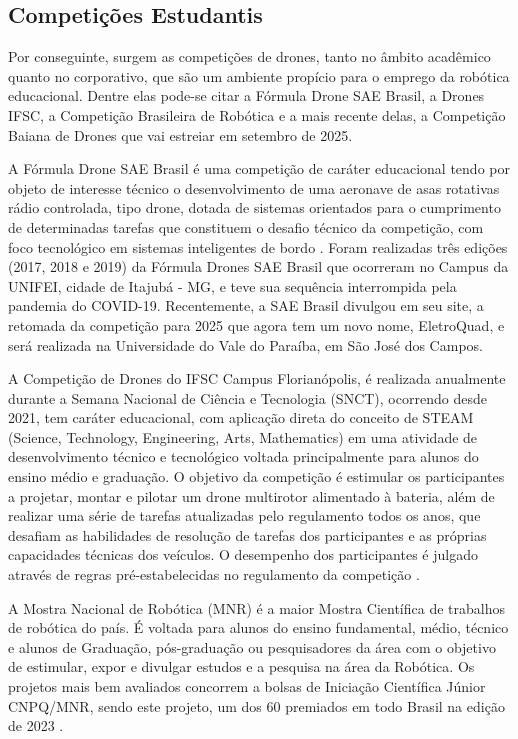 \documentclass[conference]{IEEEtran}
\begin{document}
\subsection{Competições Estudantis}

Por conseguinte, surgem as competições de drones, tanto no âmbito acadêmico quanto no corporativo, que são um ambiente propício para o emprego da robótica educacional. Dentre elas pode-se citar a Fórmula Drone SAE Brasil,  a Drones IFSC, a Competição Brasileira de Robótica e a mais recente delas, a Competição Baiana de Drones que vai estreiar em setembro de 2025.

A Fórmula Drone SAE Brasil é uma competição de caráter educacional tendo por objeto de interesse técnico o desenvolvimento de uma aeronave de asas rotativas rádio controlada, tipo drone, dotada de sistemas orientados para o cumprimento de determinadas tarefas que constituem o desafio técnico da competição, com foco tecnológico em sistemas inteligentes de bordo \cite{b7}. Foram realizadas três edições (2017, 2018 e 2019) da Fórmula Drones SAE Brasil que ocorreram no Campus da UNIFEI, cidade de Itajubá - MG, e teve sua sequência interrompida pela pandemia do COVID-19. Recentemente, a SAE Brasil divulgou em seu site, a retomada da competição para 2025 que agora tem um novo nome, EletroQuad, e será realizada na Universidade do Vale do Paraíba, em São José dos Campos.

A Competição de Drones do IFSC Campus Florianópolis, é realizada anualmente durante a Semana Nacional de Ciência e Tecnologia (SNCT), ocorrendo desde 2021, tem caráter educacional, com aplicação direta do conceito de STEAM (Science, Technology, Engineering, Arts, Mathematics) em uma atividade de desenvolvimento técnico e tecnológico voltada principalmente para alunos do ensino médio e graduação. O objetivo da competição é estimular os participantes a projetar, montar e pilotar um drone multirotor alimentado à bateria, além de realizar uma série de tarefas atualizadas pelo regulamento todos os anos, que desafiam as habilidades de resolução de tarefas dos participantes e as próprias capacidades técnicas dos veículos. O desempenho dos participantes é julgado através de regras pré-estabelecidas no regulamento da competição \cite{b4}.

A Mostra Nacional de Robótica (MNR) é a maior Mostra Científica de trabalhos de robótica do país. É voltada para alunos do ensino fundamental, médio, técnico e alunos de Graduação, pós-graduação ou pesquisadores da área com o objetivo de estimular, expor e divulgar estudos e a pesquisa na área da Robótica. Os projetos mais bem avaliados concorrem a bolsas de Iniciação Científica Júnior CNPQ/MNR, sendo este projeto, um dos 60 premiados em todo Brasil na edição de 2023 \cite{b5}.
\end{document}
